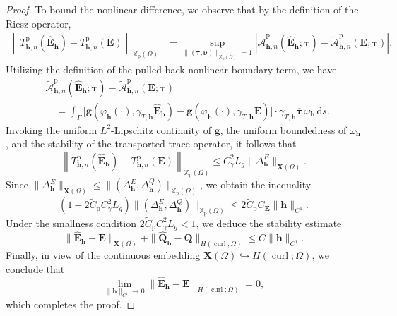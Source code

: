 \documentclass[10pt,a4paper]{amsart}
\numberwithin{equation}{section}
\begin{document}
\begin{proof}
To bound the nonlinear difference, we observe that by the definition of the Riesz operator,
\[
\begin{aligned}
\left\| T_{\mathbf{h},n}^{\mathrm{p}}(\hat{\mathbf{E}}_{\mathbf{h}}) - T_{\mathbf{h},n}^{\mathrm{p}}(\mathbf{E}) \right\|_{\mathbb{X}_{\mathrm{p}}(\Omega)} &= \sup_{\|(\boldsymbol{\tau}, \boldsymbol{\nu})\|_{\mathbb{X}_{\mathrm{p}}(\Omega)}=1} \left| \widetilde{\mathcal{A}}_{\mathbf{h},n}^{\mathrm{p}}(\hat{\mathbf{E}}_{\mathbf{h}}; \boldsymbol{\tau}) - \widetilde{\mathcal{A}}_{\mathbf{h},n}^{\mathrm{p}}(\mathbf{E}; \boldsymbol{\tau}) \right|.
\end{aligned}
\]
Utilizing the definition of the pulled-back nonlinear boundary term, we have
\[
\begin{aligned}
&\widetilde{\mathcal{A}}_{\mathbf{h},n}^{\mathrm{p}}(\hat{\mathbf{E}}_{\mathbf{h}}; \boldsymbol{\tau}) - \widetilde{\mathcal{A}}_{\mathbf{h},n}^{\mathrm{p}}(\mathbf{E}; \boldsymbol{\tau}) \\
&\quad =  \int_\Gamma \Big[ \mathbf{g}(\varphi_{\mathbf{h}}(\cdot), \gamma_{T,\mathbf{h}} \hat{\mathbf{E}}_{\mathbf{h}}) - \mathbf{g}(\varphi_{\mathbf{h}}(\cdot), \gamma_{T,\mathbf{h}} \mathbf{E}) \Big] \cdot \gamma_{T,\mathbf{h}} \overline{\boldsymbol{\tau}} \, \omega_{\mathbf{h}} \, \mathrm{d}s.
\end{aligned}
\]
Invoking the uniform $L^2$-Lipschitz continuity of $\mathbf{g}$, the uniform boundedness of $\omega_{\mathbf{h}}$, and the stability of the transported trace operator, it follows that
\[
\left\| T_{\mathbf{h},n}^{\mathrm{p}}(\hat{\mathbf{E}}_{\mathbf{h}}) - T_{\mathbf{h},n}^{\mathrm{p}}(\mathbf{E}) \right\|_{\mathbb{X}_{\mathrm{p}}(\Omega)} \le C_\gamma^2 L_g \|\Delta_{\mathbf{h}}^E\|_{\mathbf{X}(\Omega)}.
\]
Since $\|\Delta_{\mathbf{h}}^E\|_{\mathbf{X}(\Omega)} \le \|(\Delta_{\mathbf{h}}^E, \Delta_{\mathbf{h}}^Q)\|_{\mathbb{X}_{\mathrm{p}}(\Omega)}$, we obtain the inequality
\[
\left( 1 - 2\widetilde{C}_{\mathrm{p}} C_\gamma^2 L_g \right) \|(\Delta_{\mathbf{h}}^E, \Delta_{\mathbf{h}}^Q)\|_{\mathbb{X}_{\mathrm{p}}(\Omega)} \le 2\widetilde{C}_{\mathrm{p}} C_{\mathbf{E}} \|\mathbf{h}\|_{C^1}.
\]
Under the smallness condition $2\widetilde{C}_{\mathrm{p}} C_\gamma^2 L_g < 1$, we deduce the stability estimate
\[
\|\hat{\mathbf{E}}_{\mathbf{h}} - \mathbf{E}\|_{\mathbf{X}(\Omega)} + \|\hat{\mathbf{Q}}_{\mathbf{h}} - \mathbf{Q}\|_{H(\operatorname{curl}; \Omega)} \le C \|\mathbf{h}\|_{C^1}.
\]
Finally, in view of the continuous embedding $\mathbf{X}(\Omega) \hookrightarrow H(\operatorname{curl}; \Omega)$, we conclude that
\[
\lim_{\|\mathbf{h}\|_{C^1} \to 0} \|\hat{\mathbf{E}}_{\mathbf{h}} - \mathbf{E}\|_{H(\operatorname{curl}; \Omega)} = 0,
\]
which completes the proof.


\end{proof}
\end{document}

